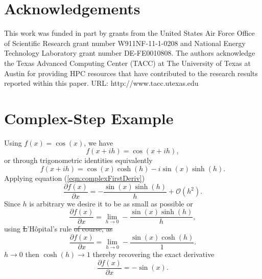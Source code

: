 \documentclass[preprint,12pt]{elsarticle}
\providecommand{\DIFaddtex}[1]{{\protect\color{blue}\uwave{#1}}} %
\providecommand{\DIFdeltex}[1]{{\protect\color{red}\sout{#1}}}                      %
\providecommand{\DIFaddbegin}{} %
\providecommand{\DIFaddend}{} %
\providecommand{\DIFdelbegin}{} %
\providecommand{\DIFdelend}{} %
\providecommand{\DIFadd}[1]{\texorpdfstring{\DIFaddtex{#1}}{#1}} %
\providecommand{\DIFdel}[1]{\texorpdfstring{\DIFdeltex{#1}}{}} %
\begin{document}
\section{Acknowledgements}
\label{sec:ack}
This work was funded in part by grants from the United States Air Force Office of Scientific Research grant number W911NF-11-1-0208 and National Energy Technology Laboratory grant number DE-FE0010808. The authors acknowledge the Texas Advanced Computing Center (TACC) at The University of Texas at Austin for providing HPC resources that have contributed to the research results reported within this paper. URL: http://www.tacc.utexas.edu


\DIFaddbegin \section{\DIFadd{References}}

\DIFaddend 


\appendix
\renewcommand*{\thesection}{\Alph{section}}
%
\section{Complex-Step Example}
\label{sec:appendixA}
%
Using $f(x) = \cos(x)$, we have
%
\[
f (x + i h) = \cos(x + i h),
\]
%
or through trigonometric identities equivalently
%
\DIFdelbegin %
\DIFdelend \DIFaddbegin \[
f(x + i h) = \cos(x) \cosh(h) - i \sin(x) \sinh(h).
\]
\DIFaddend %
Applying equation (\ref{eqn:complexFirstDeriv})
\DIFdelbegin %
\DIFdelend \DIFaddbegin \[
    \frac{\partial f(x)}{\partial x} = - \frac{\sin(x) \sinh(h)}{h} + \mathcal{O}(h^2).
\]
\DIFaddend Since $h$ is arbitrary we desire it to be as small as possible or
\[
\frac{\partial f(x)}{\partial x} = \lim_{h \to 0} - \frac{\sin(x) \sinh(h)}{h},
\]
using \DIFdelbegin \DIFdel{L}\DIFdelend \DIFaddbegin \DIFadd{l}\DIFaddend 'H\^opital's rule
\DIFdelbegin %
\DIFdel{of course, as }\DIFdelend \DIFaddbegin \[
\frac{\partial f(x)}{\partial x} = \lim_{h \to 0} - \frac{\sin(x) \cosh(h)}{1}.
\]
\DIFadd{As }\DIFaddend $h \to 0$ then $\cosh(h) \to 1$ thereby recovering the exact derivative
\[
\frac{\partial f(x)}{\partial x} =-\sin(x).
\]
\end{document}
